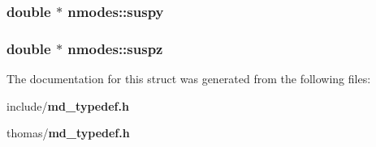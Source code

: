 \subsubsection{\setlength{\rightskip}{0pt plus 5cm}double $\ast$ {\bf nmodes::suspy}}\label{structnmodes_80324764690cceac43382871cfbb12c7}


\subsubsection{\setlength{\rightskip}{0pt plus 5cm}double $\ast$ {\bf nmodes::suspz}}\label{structnmodes_22edd8200b5a85126df2775d51f62916}




The documentation for this struct was generated from the following files:\begin{CompactItemize}
\item 
include/{\bf md\_\-typedef.h}\item 
thomas/{\bf md\_\-typedef.h}\end{CompactItemize}
